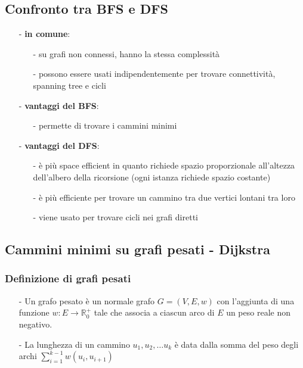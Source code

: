 \documentclass[a4paper]{article}
\begin{document}
\subsection{Confronto tra BFS e DFS}
\begin{itemize}[topsep=3pt, itemsep=0pt]
	\item[-] \textbf{in comune}:
	\begin{itemize}[topsep=0pt, itemsep=0pt]
		\item[-] su grafi non connessi, hanno la stessa complessità
		\item[-] possono essere usati indipendentemente per trovare connettività, spanning tree e cicli
	\end{itemize}
	\item[-] \textbf{vantaggi del BFS}:
	\begin{itemize}[topsep=0pt, itemsep=0pt]
		\item[-] permette di trovare i cammini minimi
	\end{itemize}
	\item[-] \textbf{vantaggi del DFS}:
	\begin{itemize}[topsep=0pt, itemsep=0pt]
		\item[-] è più space efficient in quanto richiede spazio proporzionale all'altezza dell'albero della ricorsione (ogni istanza richiede spazio costante)
		\item[-] è più efficiente per trovare un cammino tra due vertici lontani tra loro
		\item[-] viene usato per trovare cicli nei grafi diretti
	\end{itemize}
\end{itemize}

\newpage

\subsection{Cammini minimi su grafi pesati - Dijkstra}
\subsubsection*{Definizione di grafi pesati}
\begin{itemize}
	\item[-] Un grafo pesato è un normale grafo \(G = (V,E,w)\) con l'aggiunta di una funzione \(w: E \to \mathbb{R}_0^+\) tale
	che associa a ciascun arco di \(E\) un peso reale non negativo.
	\item[-] La lunghezza di un cammino \(u_1, u_2, \dots u_k\) è data dalla somma del peso degli archi \(\displaystyle \sum_{i=1}^{k-1} w(u_i,u_{i+1})\)
\end{itemize}
\end{document}
